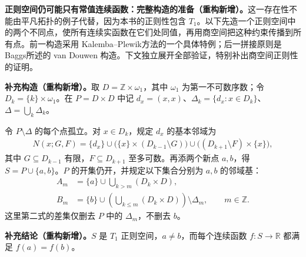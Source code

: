 \documentclass[../../main.tex]{subfiles}
\begin{document}
\begin{remark}\label{supplement:ch04-regular-constant-construction}
\textbf{正则空间仍可能只有常值连续函数：完整构造的准备（重构新增）。}这一存在性不能由平凡拓扑的例子代替，因为本书的正则性包含 $T_1$。以下先造一个正则空间中的两个不同点，使所有连续实函数在它们处同值，再用商空间把这种约束传播到所有点。前一构造采用 Kalemba--Plewik\cite[\S2]{supp-kalemba-plewik-2017}方法的一个具体特例；后一拼接原则是 Baggs\cite[\S2]{supp-baggs-1989}所述的 van Douwen 构造。下文独立展开全部验证，特别补出商空间正则性的证明。
\end{remark}
\begin{definition*}[用于构造的分层空间]\label{definition:ch04-layered-twin-space}
\textbf{补充构造（重构新增）。}取 $D=\mathbb Z\times\omega_1$，其中 $\omega_1$ 为第一不可数序数；令 $D_k=\{k\}\times\omega_1$。在 $P=D\times D$ 中记 $d_x=(x,x)$、$\Delta_k=\{d_x:x\in D_k\}$、$\Delta=\bigcup_k\Delta_k$。

令 $P\setminus\Delta$ 的每个点孤立。对 $x\in D_k$，规定 $d_x$ 的基本邻域为
\begin{align*}
N(x;G,F)=\{d_x\}
\cup\bigl(\{x\}\times(D_{k-1}\setminus G)\bigr)
\cup\bigl((D_{k+1}\setminus F)\times\{x\}\bigr),
\end{align*}
其中 $G\subseteq D_{k-1}$ 有限，$F\subseteq D_{k+1}$ 至多可数。再添两个新点 $a,b$，得 $S=P\cup\{a,b\}$。$P$ 的开集仍开，并规定以下集合分别为 $a,b$ 的邻域基：
\begin{align*}
A_m&=\{a\}\cup\bigcup_{k>m}(D_k\times D),\\
B_m&=\{b\}\cup\left(\bigcup_{k\le m}(D_k\times D)\right)\setminus\Delta_m,
\qquad m\in\mathbb Z.
\end{align*}
这里第二式的差集仅删去 $P$ 中的 $\Delta_m$，不删去 $b$。
\end{definition*}
\begin{proposition}[构造中的两个点]\label{proposition:ch04-regular-twins}
\textbf{补充结论（重构新增）。}$S$ 是 $T_1$ 正则空间，$a\ne b$，而每个连续函数 $f:S\to\mathbb R$ 都满足 $f(a)=f(b)$。
\end{proposition}
\end{document}
